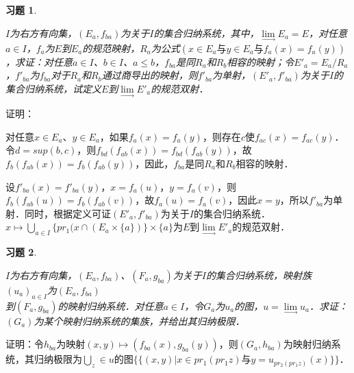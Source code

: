 \documentclass[12pt, a4paper, oneside]{book}
\newtheorem{exer}{习题}
\begin{document}
			\begin{exer}\label{exer195}
				\hfill\par
				$I$为右方有向集，$(E_a, f_{ba})$为关于$I$的集合归纳系统，其中，$\lim\limits_\to E_a=E$，对任意$a\in I$，$f_a$为$E$到$E_a$的规范映射，$R_a$为公式$(x\in E_a\text{与}y\in E_a\text{与}f_a(x)=f_a(y))$，求证：对任意$a\in I$、$b\in I$、$a\leq b$，$f_{ba}$是同$R_a$和$R_b$相容的映射；令${E'}_a=E_a/R_a$，${f'}_{ba}$为$f_{ba}$对于$R_a$和$R_b$通过商导出的映射，则${f'}_{ba}$为单射，$({E'}_a, {f'}_{ba})$为关于$I$的集合归纳系统，试定义$E$到$\lim\limits_\to {E'}_a$的规范双射．
			\end{exer}
			证明：
			\par
			对任意$x\in E_a$、$y\in E_a$，如果$f_a(x)= f_a(y)$，则存在$c$使$f_{ac}(x)=f_{ac}(y)$．令$d=sup(b, c)$，则$f_{bd}(f_{ab}(x))=f_{bd}(f_{ab}(y))$，故$f_b(f_{ab}(x))=f_b(f_{ab}(y))$，因此，$f_{ba}$是同$R_a$和$R_b$相容的映射．
			\par
			设${f'}_{ba}(x)={f'}_{ba}(y)$，$x=f_a(u)$，$y=f_a(v)$，则$f_b(f_{ab}(u))= f_b(f_{ab}(v))$，故$f_a(u)=f_a(v)$，因此$x=y$，所以${f'}_{ba}$为单射．同时，根据定义可证$({E'}_a, {f'}_{ba})$为关于$I$的集合归纳系统．$x\mapsto \bigcup\limits_{a\in I}\{pr_1(x\cap(E_a\times \{a\})\}\times \{a\}$为$E$到$\lim\limits_\to {E'}_a$的规范双射．			
			
			\begin{exer}\label{exer196}
				\hfill\par
				$I$为右方有向集，$(E_a, f_{ba})$、$(F_a, g_{ba})$为关于$I$的集合归纳系统，映射族$(u_a)_{a\in I}$为$(E_a, f_{ba})$\\到$(F_a, g_{ba})$的映射归纳系统．对任意$a\in I$，令$G_a$为$u_a$的图，$u=\lim\limits_\to u_a$．求证：$(G_a)$为某个映射归纳系统的集族，并给出其归纳极限．
			\end{exer}
			证明：令$h_{ba}$为映射$(x, y)\mapsto (f_{ba}(x), g_{ba}(y))$，则$(G_a, h_{ba})$为映射归纳系统，其归纳极限为$\bigcup\limits_z\in u\text{的图}\{\{(x, y)|x\in pr_1(pr_1z)\text{与}y=u_{pr_2(pr_1z)}(x)\}\}$．
					
\end{document}
